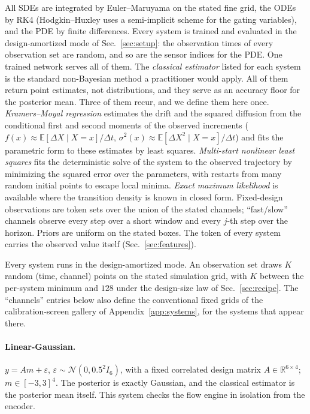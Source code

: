 \documentclass[10pt]{article}
\newcommand{\R}{\mathbb{R}}
\newcommand{\E}{\mathbb{E}}
\newcommand{\N}{\mathcal{N}}
\begin{document}
All SDEs are integrated by Euler--Maruyama on the stated fine grid, the ODEs by RK4 (Hodgkin--Huxley
uses a semi-implicit scheme for the gating variables), and the PDE by finite differences. Every system
is trained and evaluated in the design-amortized mode of Sec.~\ref{sec:setup}: the observation times
of every observation set are random, and so are the sensor indices for the PDE. One trained network
serves all of them. The \emph{classical estimator} listed for each system is the standard non-Bayesian
method a practitioner would apply. All of them return point estimates, not distributions, and they
serve as an accuracy floor for the posterior mean. Three of them recur, and we define them here once.
\emph{Kramers--Moyal regression} estimates the drift and the squared diffusion from the conditional
first and second moments of the observed increments ($f(x) \approx \E[\Delta X \mid X = x]/\Delta t$,
$\sigma^2(x) \approx \E[\Delta X^2 \mid X = x]/\Delta t$) and fits the parametric form to these
estimates by least squares. \emph{Multi-start nonlinear least squares} fits the deterministic solve of
the system to the observed trajectory by minimizing the squared error over the parameters, with
restarts from many random initial points to escape local minima. \emph{Exact maximum likelihood} is
available where the transition density is known in closed form. Fixed-design observations are token
sets over the union of the stated channels; ``fast/slow'' channels observe every step over a short
window and every $j$-th step over the horizon. Priors are uniform on the stated boxes. The token of
every system carries the observed value itself (Sec.~\ref{sec:features}).

Every system runs in the design-amortized mode. An observation set draws $K$ random (time, channel)
points on the stated simulation grid, with $K$ between the per-system minimum and $128$ under the
design-size law of Sec.~\ref{sec:recipe}. The ``channels'' entries below also define the conventional
fixed grids of the calibration-screen gallery of Appendix~\ref{app:systems}, for the systems that
appear there.

\paragraph{Linear-Gaussian.} $y = Am + \varepsilon$, $\varepsilon \sim \N(0, 0.5^2 I_6)$, with a fixed
correlated design matrix $A \in \R^{6 \times 4}$; $m \in [-3, 3]^4$. The posterior is exactly
Gaussian, and the classical estimator is the posterior mean itself. This system checks the flow
engine in isolation from the encoder.
\end{document}
